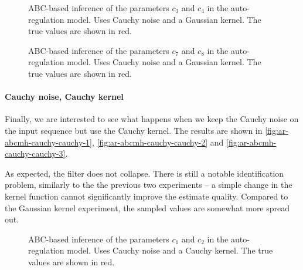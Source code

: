 \begin{figure}[htp]%
    \centering
    \qquad
    \caption{ABC-based inference of the parameters $c_3$ and $c_4$ in the auto-regulation model. Uses Cauchy noise and a Gaussian kernel. The true values are shown in red.}%
    \label{fig:ar-abcmh-cauchy-gauss-2}%
\end{figure}

\begin{figure}[htp]%
    \centering
    \qquad
    \caption{ABC-based inference of the parameters $c_7$ and $c_8$ in the auto-regulation model. Uses Cauchy noise and a Gaussian kernel. The true values are shown in red.}%
    \label{fig:ar-abcmh-cauchy-gauss-3}%
\end{figure}

\paragraph{Cauchy noise, Cauchy kernel}
Finally, we are interested to see what happens when we keep the Cauchy noise on the input sequence but use the Cauchy kernel. The results are shown in \autoref{fig:ar-abcmh-cauchy-cauchy-1}, \autoref{fig:ar-abcmh-cauchy-cauchy-2} and \autoref{fig:ar-abcmh-cauchy-cauchy-3}.

As expected, the filter does not collapse. There is still a notable identification problem, similarly to the the previous two experiments -- a simple change in the kernel function cannot significantly improve the estimate quality. Compared to the Gaussian kernel experiment, the sampled values are somewhat more spread out.

\begin{figure}[htp]%
    \centering
    \qquad
    \caption{ABC-based inference of the parameters $c_1$ and $c_2$ in the auto-regulation model. Uses Cauchy noise and a Cauchy kernel. The true values are shown in red.}%
    \label{fig:ar-abcmh-cauchy-cauchy-1}%
\end{figure}

